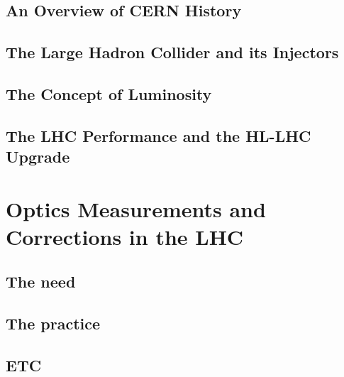 \subsection{An Overview of CERN History}

\subsection{The Large Hadron Collider and its Injectors}

\subsection{The Concept of Luminosity}

\subsection{The LHC Performance and the HL-LHC Upgrade}


\section{Optics Measurements and Corrections in the LHC}

\subsection{The need}

\subsection{The practice}

\subsection{ETC}